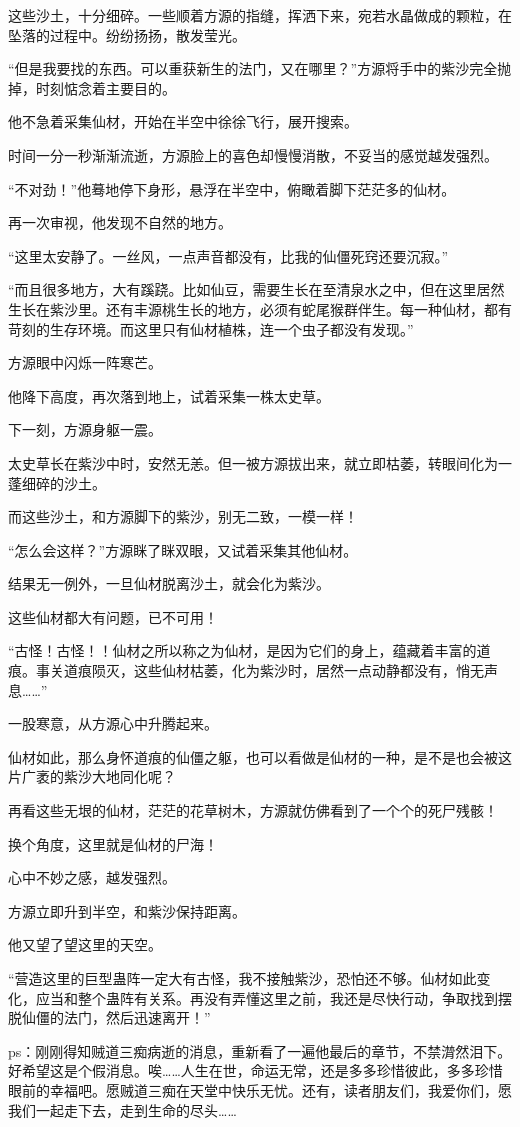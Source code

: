 \begin{this_body}
这些沙土，十分细碎。一些顺着方源的指缝，挥洒下来，宛若水晶做成的颗粒，在坠落的过程中。纷纷扬扬，散发莹光。

“但是我要找的东西。可以重获新生的法门，又在哪里？”方源将手中的紫沙完全抛掉，时刻惦念着主要目的。

他不急着采集仙材，开始在半空中徐徐飞行，展开搜索。

时间一分一秒渐渐流逝，方源脸上的喜色却慢慢消散，不妥当的感觉越发强烈。

“不对劲！”他蓦地停下身形，悬浮在半空中，俯瞰着脚下茫茫多的仙材。

再一次审视，他发现不自然的地方。

“这里太安静了。一丝风，一点声音都没有，比我的仙僵死窍还要沉寂。”

“而且很多地方，大有蹊跷。比如仙豆，需要生长在至清泉水之中，但在这里居然生长在紫沙里。还有丰源桃生长的地方，必须有蛇尾猴群伴生。每一种仙材，都有苛刻的生存环境。而这里只有仙材植株，连一个虫子都没有发现。”

方源眼中闪烁一阵寒芒。

他降下高度，再次落到地上，试着采集一株太史草。

下一刻，方源身躯一震。

太史草长在紫沙中时，安然无恙。但一被方源拔出来，就立即枯萎，转眼间化为一蓬细碎的沙土。

而这些沙土，和方源脚下的紫沙，别无二致，一模一样！

“怎么会这样？”方源眯了眯双眼，又试着采集其他仙材。

结果无一例外，一旦仙材脱离沙土，就会化为紫沙。

这些仙材都大有问题，已不可用！

“古怪！古怪！！仙材之所以称之为仙材，是因为它们的身上，蕴藏着丰富的道痕。事关道痕陨灭，这些仙材枯萎，化为紫沙时，居然一点动静都没有，悄无声息……”

一股寒意，从方源心中升腾起来。

仙材如此，那么身怀道痕的仙僵之躯，也可以看做是仙材的一种，是不是也会被这片广袤的紫沙大地同化呢？

再看这些无垠的仙材，茫茫的花草树木，方源就仿佛看到了一个个的死尸残骸！

换个角度，这里就是仙材的尸海！

心中不妙之感，越发强烈。

方源立即升到半空，和紫沙保持距离。

他又望了望这里的天空。

“营造这里的巨型蛊阵一定大有古怪，我不接触紫沙，恐怕还不够。仙材如此变化，应当和整个蛊阵有关系。再没有弄懂这里之前，我还是尽快行动，争取找到摆脱仙僵的法门，然后迅速离开！”

ps：刚刚得知贼道三痴病逝的消息，重新看了一遍他最后的章节，不禁潸然泪下。好希望这是个假消息。唉……人生在世，命运无常，还是多多珍惜彼此，多多珍惜眼前的幸福吧。愿贼道三痴在天堂中快乐无忧。还有，读者朋友们，我爱你们，愿我们一起走下去，走到生命的尽头……

\end{this_body}

